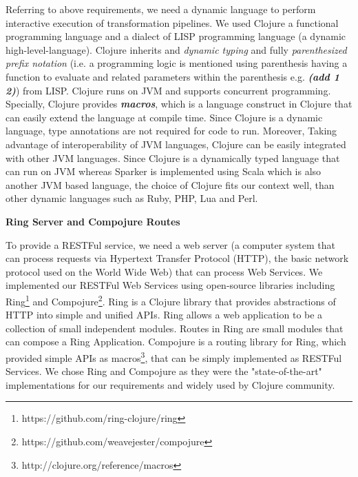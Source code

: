 Referring to above requirements, we need a dynamic language to perform interactive execution of transformation pipelines. We used Clojure \cite{clojure} a functional programming language and a dialect of LISP\cite{lisp} programming language (a dynamic high-level-language). Clojure inherits  and \textit{dynamic typing} and fully \textit{parenthesized prefix notation} (i.e. a programming logic is mentioned using parenthesis having a function to evaluate and related parameters within the parenthesis e.g. \textit{\textbf{(add 1 2)}}) from LISP. Clojure runs on JVM and supports concurrent programming. Specially, Clojure provides \textit{\textbf{macros}}, which is a language construct in Clojure that can easily extend the language at compile time. Since Clojure is a dynamic language, type annotations are not required for code to run. Moreover, Taking advantage of  interoperability of JVM languages, Clojure can be easily integrated with other JVM languages. Since Clojure is a dynamically typed language that can run on JVM whereas Sparker is implemented using Scala which is also another JVM based language, the choice of Clojure fits our context well, than other dynamic languages such as Ruby, PHP, Lua and Perl. 

\textbf{Ring Server and Compojure Routes}

To provide a RESTFul service, we need a web server (a computer system that can process requests via Hypertext Transfer Protocol (HTTP), the basic network protocol used on the World Wide Web) that can process Web Services. We implemented our RESTFul Web Services using open-source libraries including Ring\footnote{https://github.com/ring-clojure/ring} and Compojure\footnote{https://github.com/weavejester/compojure}. Ring is a Clojure library that provides abstractions of HTTP into simple and unified APIs. Ring allows a web application to be a collection of small independent modules. Routes in Ring are small modules that can compose a Ring Application. Compojure is a routing library for Ring, which provided simple APIs as macros\footnote{http://clojure.org/reference/macros}, that can be simply implemented as RESTFul Services. We chose Ring and Compojure as they were the "state-of-the-art" implementations for our requirements and widely used by Clojure community. 
